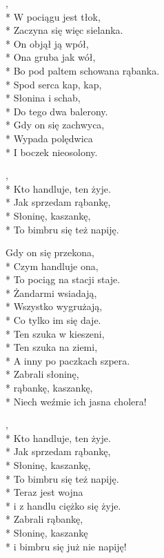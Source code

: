 \begin{lyrics}[multicol=true, longestline={Bo pod paltem schowana rąbanka.}]
,\\*
W pociągu jest tłok,\\*
Zaczyna się więc sielanka.\\*
On objął ją wpół,\\*
Ona gruba jak wół,\\*
Bo pod paltem schowana rąbanka.\\*
\medskip
Spod serca kap, kap,\\*
Słonina i schab,\\*
Do tego dwa balerony.\\*
Gdy on się zachwyca,\\*
Wypada polędwica\\*
I boczek nieosolony.

\begin{chorus}
,\\*
Kto handluje, ten żyje.\\*
Jak sprzedam rąbankę,\\*
Słoninę, kaszankę,\\*
To bimbru się też napiję.
\end{chorus}

Gdy on się przekona,\\*
Czym handluje ona,\\*
To pociąg na stacji staje.\\*
Żandarmi wsiadają,\\*
Wszystko wygrużają,\\*
Co tylko im się daje.\\*
\medskip
Ten szuka w kieszeni,\\*
Ten szuka na ziemi,\\*
A inny po paczkach szpera.\\*
Zabrali słoninę,\\*
rąbankę, kaszankę,\\*
Niech weźmie ich jasna cholera!

\begin{chorus}
,\\*
Kto handluje, ten żyje.\\*
Jak sprzedam rąbankę,\\*
Słoninę, kaszankę,\\*
To bimbru się też napiję.\\*
\medskip
Teraz jest wojna\\*
i z handlu ciężko się żyje.\\*
Zabrali rąbankę,\\*
Słoninę, kaszankę\\*
i bimbru się już nie napiję!
\end{chorus}

\end{lyrics}



